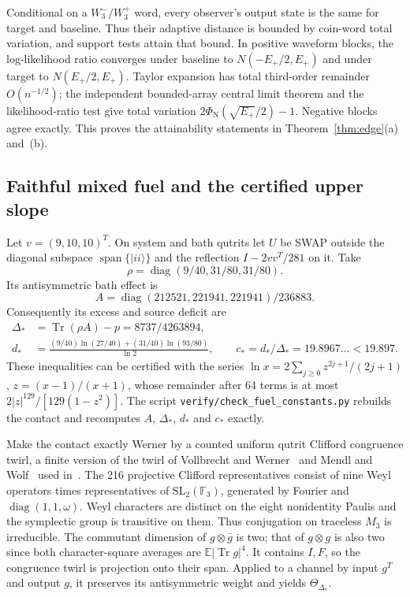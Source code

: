 \documentclass[11pt]{article}
\theoremstyle{definition}
\theoremstyle{remark}
\DeclareMathOperator{\Tr}{Tr}
\DeclareMathOperator{\spanop}{span}
\newcommand{\E}{\mathbb E}
\newcommand{\ket}[1]{\lvert#1\rangle}
\newcommand{\Ncdf}{\Phi_{\mathrm N}}
\newcommand{\Wminus}{W_3^-}
\newcommand{\Wplus}{W_3^+}
\begin{document}
Conditional on a $\Wminus/\Wplus$ word, every observer's output state is the same for target and baseline. Thus their adaptive distance is bounded by coin-word total variation, and support tests attain that bound. In positive waveform blocks, the log-likelihood ratio converges under baseline to $N(-E_+/2,E_+)$ and under target to $N(E_+/2,E_+)$. Taylor expansion has total third-order remainder $O(n^{-1/2})$; the independent bounded-array central limit theorem and the likelihood-ratio test give total variation $2\Ncdf(\sqrt{E_+}/2)-1$. Negative blocks agree exactly. This proves the attainability statements in Theorem~\ref{thm:edge}(a) and~(b).

\subsection{Faithful mixed fuel and the certified upper slope}

Let $v=(9,10,10)^T$. On system and bath qutrits let $U$ be SWAP outside the diagonal subspace $\spanop\{\ket{ii}\}$ and the reflection $I-2vv^T/281$ on it. Take
\[
 \rho=\operatorname{diag}(9/40,31/80,31/80).
\]
Its antisymmetric bath effect is
\[
 A=\operatorname{diag}(212521,221941,221941)/236883.
\]
Consequently its excess and source deficit are
\begin{align*}
 \Delta_*&=\Tr(\rho A)-p=8737/4263894,\\
 d_*&=\frac{(9/40)\ln(27/40)+(31/40)\ln(93/80)}{\ln2},\qquad
 c_*=d_*/\Delta_*=19.8967\ldots<19.897.
\end{align*}
These inequalities can be certified with the series
$\ln x=2\sum_{j\ge0}z^{2j+1}/(2j+1)$, $z=(x-1)/(x+1)$, whose remainder after 64 terms is at most $2|z|^{129}/[129(1-z^2)]$. The script \texttt{verify/check\_fuel\_constants.py} rebuilds the contact and recomputes $A$, $\Delta_*$, $d_*$ and $c_*$ exactly.

Make the contact exactly Werner by a counted uniform qutrit Clifford congruence twirl, a finite version of the twirl of Vollbrecht and Werner~\cite{VollbrechtWerner} and Mendl and Wolf~\cite{MendlWolf} used in~\cite[Definition~4.1 and Theorem~4.5]{HM2015}. The 216 projective Clifford representatives consist of nine Weyl operators times representatives of $\mathrm{SL}_2(\mathbb F_3)$, generated by Fourier and $\operatorname{diag}(1,1,\omega)$. Weyl characters are distinct on the eight nonidentity Paulis and the symplectic group is transitive on them. Thus conjugation on traceless $M_3$ is irreducible. The commutant dimension of $g\otimes\bar g$ is two; that of $g\otimes g$ is also two since both character-square averages are $\E|\Tr g|^4$. It contains $I,F$, so the congruence twirl is projection onto their span. Applied to a channel by input $g^T$ and output $g$, it preserves its antisymmetric weight and yields $\Theta_{\Delta_*}$.
\end{document}
